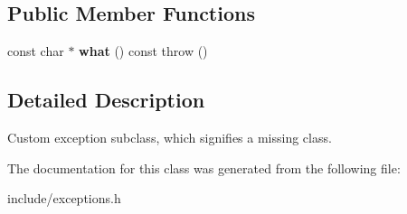 \subsection*{Public Member Functions}
\begin{DoxyCompactItemize}
\item 
\mbox{\label{classClassNotFoundError_ac3e4abee30e3a59364d93cdf11779345}} 
const char $\ast$ {\bfseries what} () const  throw ()
\end{DoxyCompactItemize}


\subsection{Detailed Description}
Custom exception subclass, which signifies a missing class. 

The documentation for this class was generated from the following file\+:\begin{DoxyCompactItemize}
\item 
include/exceptions.\+h\end{DoxyCompactItemize}
